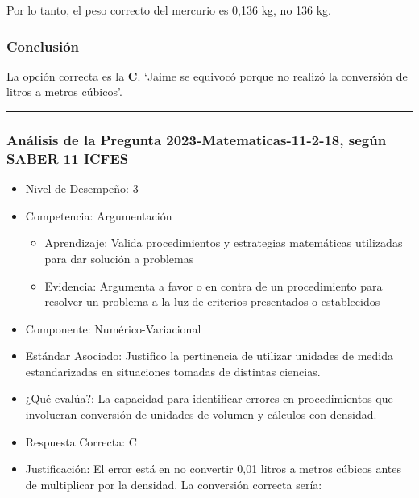 \documentclass[
]{article}
\providecommand{\tightlist}{%
  \setlength{\itemsep}{0pt}\setlength{\parskip}{0pt}}
\begin{document}
Por lo tanto, el peso correcto del mercurio es 0,136 kg, no 136 kg.

\subsubsection{Conclusión}\label{conclusiuxf3n-13}

La opción correcta es la \textbf{C}. `Jaime se equivocó porque no
realizó la conversión de litros a metros cúbicos'.

\begin{center}\rule{0.5\linewidth}{0.5pt}\end{center}

\subsubsection{Análisis de la Pregunta 2023-Matematicas-11-2-18, según
SABER 11
ICFES}\label{anuxe1lisis-de-la-pregunta-2023-matematicas-11-2-18-seguxfan-saber-11-icfes}

\begin{itemize}
\tightlist
\item
  Nivel de Desempeño: 3
\item
  Competencia: Argumentación

  \begin{itemize}
  \tightlist
  \item
    Aprendizaje: Valida procedimientos y estrategias matemáticas
    utilizadas para dar solución a problemas
  \item
    Evidencia: Argumenta a favor o en contra de un procedimiento para
    resolver un problema a la luz de criterios presentados o
    establecidos
  \end{itemize}
\item
  Componente: Numérico-Variacional
\item
  Estándar Asociado: Justifico la pertinencia de utilizar unidades de
  medida estandarizadas en situaciones tomadas de distintas ciencias.
\item
  ¿Qué evalúa?: La capacidad para identificar errores en procedimientos
  que involucran conversión de unidades de volumen y cálculos con
  densidad.
\item
  Respuesta Correcta: C
\item
  Justificación: El error está en no convertir 0,01 litros a metros
  cúbicos antes de multiplicar por la densidad. La conversión correcta
  sería:
\end{itemize}
\end{document}
